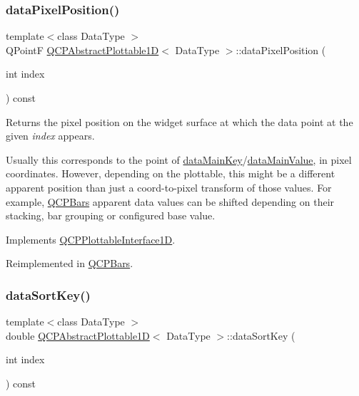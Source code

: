 \subsubsection{\texorpdfstring{data\+Pixel\+Position()}{dataPixelPosition()}}
{\footnotesize\ttfamily template$<$class Data\+Type $>$ \\
Q\+PointF \hyperlink{class_q_c_p_abstract_plottable1_d}{Q\+C\+P\+Abstract\+Plottable1D}$<$ Data\+Type $>$\+::data\+Pixel\+Position (\begin{DoxyParamCaption}\item[{int}]{index }\end{DoxyParamCaption}) const\hspace{0.3cm}{\ttfamily [virtual]}}





Returns the pixel position on the widget surface at which the data point at the given {\itshape index} appears.

Usually this corresponds to the point of \hyperlink{class_q_c_p_abstract_plottable1_d_ab14ab428595856bf76e04499017fa8dc}{data\+Main\+Key}/\hyperlink{class_q_c_p_abstract_plottable1_d_a0f913bb0889ca7cb574657a078fc8cff}{data\+Main\+Value}, in pixel coordinates. However, depending on the plottable, this might be a different apparent position than just a coord-\/to-\/pixel transform of those values. For example, \hyperlink{class_q_c_p_bars}{Q\+C\+P\+Bars} apparent data values can be shifted depending on their stacking, bar grouping or configured base value. 

Implements \hyperlink{class_q_c_p_plottable_interface1_d_a78911838cfbcfd2d8df9ad2fdbfb8e93}{Q\+C\+P\+Plottable\+Interface1D}.



Reimplemented in \hyperlink{class_q_c_p_bars_a55cdaf565cd3384158d1f7f89533bc2d}{Q\+C\+P\+Bars}.

\mbox{\label{class_q_c_p_abstract_plottable1_d_a6fce4e684f33a31c45928899b5d9ab4b}} 
\subsubsection{\texorpdfstring{data\+Sort\+Key()}{dataSortKey()}}
{\footnotesize\ttfamily template$<$class Data\+Type $>$ \\
double \hyperlink{class_q_c_p_abstract_plottable1_d}{Q\+C\+P\+Abstract\+Plottable1D}$<$ Data\+Type $>$\+::data\+Sort\+Key (\begin{DoxyParamCaption}\item[{int}]{index }\end{DoxyParamCaption}) const\hspace{0.3cm}{\ttfamily [virtual]}}





